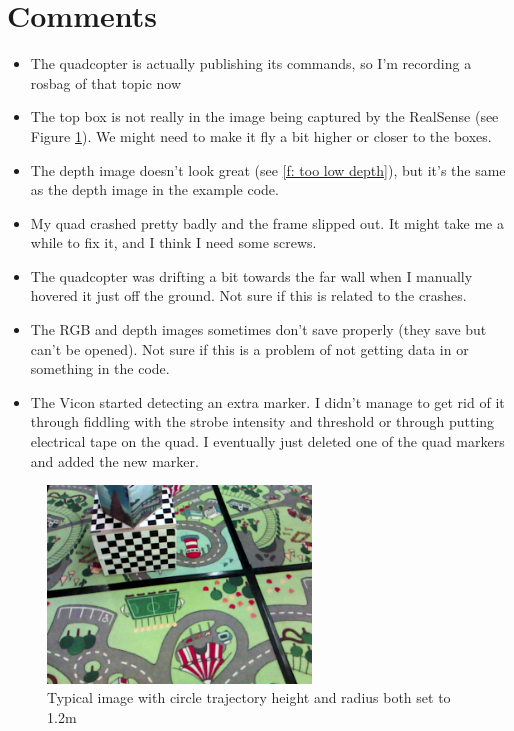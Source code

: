 \documentclass[12pt,a4paper]{article}
\begin{document}
\section{Comments}
\begin{itemize}
\item The quadcopter is actually publishing its commands, so I'm recording a rosbag of that topic now
\item The top box is not really in the image being captured by the RealSense (see Figure \ref{f: too low}). We might need to make it fly a bit higher or closer to the boxes.
\item The depth image doesn't look great (see \ref{f: too low depth}), but it's the same as the depth image in the example code.
\item My quad crashed pretty badly and the frame slipped out. It might take me a while to fix it, and I think I need some screws.
\item The quadcopter was drifting a bit towards the far wall when I manually hovered it just off the ground. Not sure if this is related to the crashes.
\item The RGB and depth images sometimes don't save properly (they save but can't be opened). Not sure if this is a problem of not getting data in or something in the code.
\item The Vicon started detecting an extra marker. I didn't manage to get rid of it through fiddling with the strobe intensity and threshold or through putting electrical tape on the quad. I eventually just deleted one of the quad markers and added the new marker.
\end{itemize}

\begin{figure}[h]
  \centering
    \includegraphics[width=70mm]{misc/16-6_too-low.png}
  \caption{Typical image with circle trajectory height and radius both set to 1.2m}
  \label{f: too low}
\end{figure}
\end{document}
